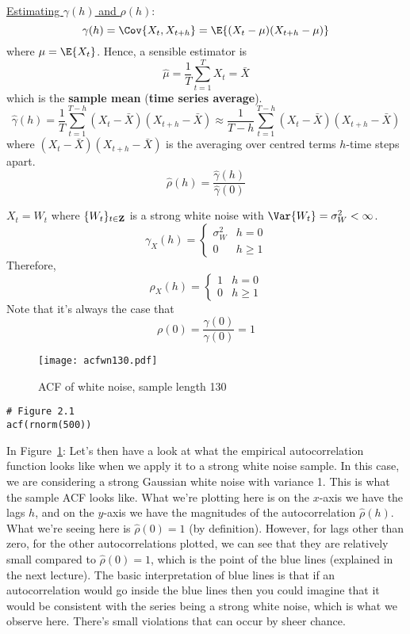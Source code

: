 \underline{Estimating $ \gamma(h) $ and $ \rho(h) $}:
\[ \gamma(h)=\Cov{X_t,X_{t+h}}=\E{(X_t-\mu)(X_{t+h}-\mu)} \]
where $ \mu=\E{X_t} $. Hence, a sensible estimator is
\[ \hat{\mu}=\frac{1}{T} \sum_{t=1}^{T} X_t=\bar{X} \]
which is the \textbf{sample mean} (\textbf{time series average}).
\[ \hat{\gamma}(h)=\frac{1}{T} \sum_{t=1}^{T-h}(X_t-\bar{X})(X_{t+h}-\bar{X})
    \approx \frac{1}{T-h} \sum_{t=1}^{T-h}(X_t-\bar{X})(X_{t+h}-\bar{X})  \]
where $ (X_t-\bar{X})(X_{t+h}-\bar{X}) $ is the averaging over
centred terms $ h $-time steps apart.
\[ \hat{\rho}(h)=\frac{\hat{\gamma}(h)}{\hat{\gamma}(0)}  \]
\begin{Example}{}{}
    $ X_t=W_t $ where $ \{W_t\}_{t\in\mathbf{Z}} $ is a strong white noise
    with $ \Var{W_t}=\sigma_W^2<\infty $.
    \[ \gamma_X(h)=\begin{cases}
            \sigma_W^2 & h=0    \\
            0          & h\ge 1
        \end{cases} \]
    Therefore,
    \[ \rho_X(h)=\begin{cases}
            1 & h=0    \\
            0 & h\ge 1
        \end{cases} \]
    Note that it's always the case that
    \[ \rho(0)=\frac{\gamma(0)}{\gamma(0)}=1  \]
\end{Example}
\begin{figure}[!ht]
    \centering
    \texttt{[image: acfwn130.pdf]}
    \caption{ACF of white noise, sample length 130}\label{fig:acfwn130}
\end{figure}
\begin{verbatim}
# Figure 2.1
acf(rnorm(500))
\end{verbatim}
In Figure~\ref{fig:acfwn130}:
{\color{blue}Let's then have a look at what the empirical autocorrelation
function looks like when we apply it to a strong white noise sample.
In this case, we are considering a strong Gaussian white noise
with variance 1. This is what the sample ACF looks like.
What we're plotting here is on the $ x $-axis we have the lags $ h $,
and on the $ y $-axis we have the magnitudes of the autocorrelation $ \hat{\rho}(h) $.
What we're seeing here
is $ \hat{\rho}(0)=1 $ (by definition). However, for lags other than zero,
for the other autocorrelations plotted, we can see that they are
relatively small compared to $ \hat{\rho}(0)=1 $,
which is the point of the blue lines (explained
in the next lecture). The basic interpretation of blue lines is that
if an autocorrelation would go inside the blue lines then you could imagine
that it would be consistent with the series being a strong white noise,
which is what we observe here. There's small violations that can occur by
sheer chance.}


